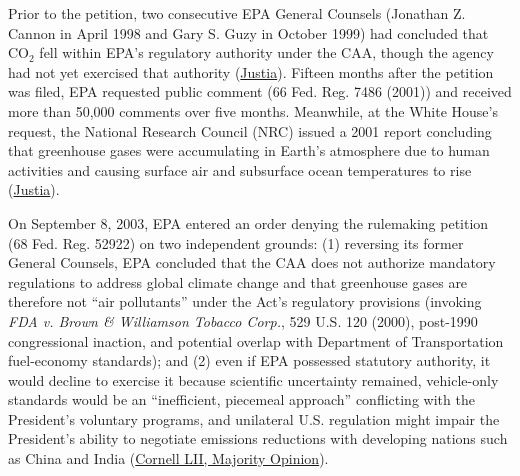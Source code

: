 \documentclass[12pt]{article}
\begin{document}
Prior to the petition, two consecutive EPA General Counsels (Jonathan Z. Cannon in April 1998 and Gary S. Guzy in October 1999) had concluded that $\mathrm{CO_2}$ fell within EPA's regulatory authority under the CAA, though the agency had not yet exercised that authority (\href{https://supreme.justia.com/cases/federal/us/549/497/}{Justia}). Fifteen months after the petition was filed, EPA requested public comment (66 Fed. Reg. 7486 (2001)) and received more than 50,000 comments over five months. Meanwhile, at the White House's request, the National Research Council (NRC) issued a 2001 report concluding that greenhouse gases were accumulating in Earth's atmosphere due to human activities and causing surface air and subsurface ocean temperatures to rise (\href{https://supreme.justia.com/cases/federal/us/549/497/}{Justia}).

On September 8, 2003, EPA entered an order denying the rulemaking petition (68 Fed. Reg. 52922) on two independent grounds: (1) reversing its former General Counsels, EPA concluded that the CAA does not authorize mandatory regulations to address global climate change and that greenhouse gases are therefore not ``air pollutants'' under the Act's regulatory provisions (invoking \textit{FDA v. Brown \& Williamson Tobacco Corp.}, 529 U.S. 120 (2000), post-1990 congressional inaction, and potential overlap with Department of Transportation fuel-economy standards); and (2) even if EPA possessed statutory authority, it would decline to exercise it because scientific uncertainty remained, vehicle-only standards would be an ``inefficient, piecemeal approach'' conflicting with the President's voluntary programs, and unilateral U.S. regulation might impair the President's ability to negotiate emissions reductions with developing nations such as China and India (\href{https://www.law.cornell.edu/supct/html/05-1120.ZO.html}{Cornell LII, Majority Opinion}).
\end{document}
